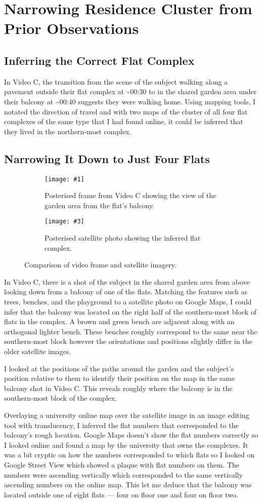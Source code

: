 \documentclass[a4paper,11pt]{report}
\newcommand{\comparison}[5] {
    \begin{figure}[htbp]
        \centering
        
        \begin{subfigure}[t]{0.45\textwidth}
            \centering
            \texttt{[image: \#1]}
            \caption{#2}
        \end{subfigure}
        \hfill
        \begin{subfigure}[t]{0.45\textwidth}
            \centering
            \texttt{[image: \#3]}
            \caption{#4}
        \end{subfigure}
    
        \caption{#5}
    \end{figure}
}
\begin{document}
\section{Narrowing Residence Cluster from Prior Observations}

\subsection{Inferring the Correct Flat Complex}

In Video C, the transition from the scene of the subject walking along a pavement outside their flat complex at \~{}00:30 to in the shared garden area under their balcony at \~{}00:40 suggests they were walking home. Using mapping tools, I notated the direction of travel and with two maps of the cluster of all four flat complexes of the same type that I had found online, it could be inferred that they lived in the northern-most complex.

\subsection{Narrowing It Down to Just Four Flats}

\comparison
    {images/garden-balcony.png}
    {Posterised frame from Video C showing the view of the garden area from the flat's balcony.}
    {images/garden-satellite.png}
    {Posterised satellite photo showing the inferred flat complex.}
    {Comparison of video frame and satellite imagery.}

In Video C, there is a shot of the subject in the shared garden area from above looking down from a balcony of one of the flats. Matching the features such as trees, benches, and the playground to a satellite photo on Google Maps, I could infer that the balcony was located on the right half of the southern-most block of flats in the complex. A brown and green bench are adjacent along with an orthogonal lighter bench. These benches roughly correspond to the same near the southern-most block however the orientations and positions slightly differ in the older satellite images.

I looked at the positions of the paths around the garden and the subject's position relative to them to identify their position on the map in the same balcony shot in Video C. This reveals roughly where the balcony is in the southern-most block of the complex.

Overlaying a university online map over the satellite image in an image editing tool with translucency, I inferred the flat numbers that corresponded to the balcony's rough location. Google Maps doesn't show the flat numbers correctly so I looked online and found a map by the university that owns the complexes. It was a bit cryptic on how the numbers corresponded to which flats so I looked on Google Street View which showed a plaque with flat numbers on them. The numbers were ascending vertically which corresponded to the same vertically ascending numbers on the online map. This let me deduce that the balcony was located outside one of eight flats --- four on floor one and four on floor two.
\end{document}
